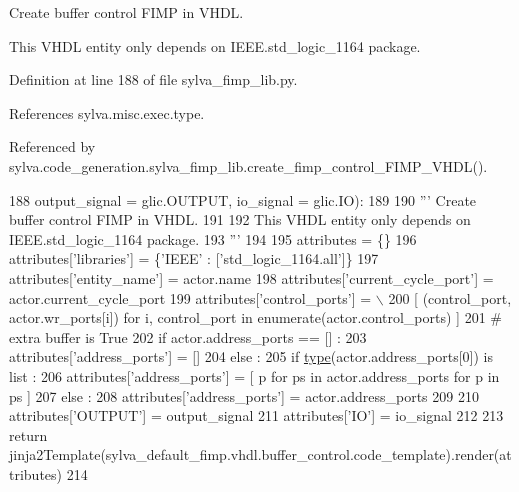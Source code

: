 \begin{DoxyVerb}Create buffer control FIMP in VHDL.

This VHDL entity only depends on IEEE.std_logic_1164 package.
\end{DoxyVerb}
 

Definition at line 188 of file sylva\+\_\+fimp\+\_\+lib.\+py.



References sylva.\+misc.\+exec.\+type.



Referenced by sylva.\+code\+\_\+generation.\+sylva\+\_\+fimp\+\_\+lib.\+create\+\_\+fimp\+\_\+control\+\_\+\+F\+I\+M\+P\+\_\+\+V\+H\+D\+L().


\begin{DoxyCode}
188     output\_signal = glic.OUTPUT, io\_signal = glic.IO):
189 
190     \textcolor{stringliteral}{''' Create buffer control FIMP in VHDL.}
191 \textcolor{stringliteral}{}
192 \textcolor{stringliteral}{    This VHDL entity only depends on IEEE.std\_logic\_1164 package.}
193 \textcolor{stringliteral}{    '''}
194 
195     attributes = \{\}
196     attributes[\textcolor{stringliteral}{'libraries'}] = \{\textcolor{stringliteral}{'IEEE'} : [\textcolor{stringliteral}{'std\_logic\_1164.all'}]\}
197     attributes[\textcolor{stringliteral}{'entity\_name'}] = actor.name
198     attributes[\textcolor{stringliteral}{'current\_cycle\_port'}] = actor.current\_cycle\_port
199     attributes[\textcolor{stringliteral}{'control\_ports'}] = \(\backslash\)
200       [ (control\_port, actor.wr\_ports[i]) \textcolor{keywordflow}{for} i, control\_port \textcolor{keywordflow}{in} enumerate(actor.control\_ports) ]
201     \textcolor{comment}{# extra buffer is True}
202     \textcolor{keywordflow}{if} actor.address\_ports == [] :
203       attributes[\textcolor{stringliteral}{'address\_ports'}] = []
204     \textcolor{keywordflow}{else} :
205       \textcolor{keywordflow}{if} \hyperlink{namespacesylva_1_1misc_1_1exec_a55d55e6d0e68715dfbd883034bd7290c}{type}(actor.address\_ports[0]) \textcolor{keywordflow}{is} list :
206         attributes[\textcolor{stringliteral}{'address\_ports'}] = [ p \textcolor{keywordflow}{for} ps \textcolor{keywordflow}{in} actor.address\_ports \textcolor{keywordflow}{for} p \textcolor{keywordflow}{in} ps ]
207       \textcolor{keywordflow}{else} :
208         attributes[\textcolor{stringliteral}{'address\_ports'}] = actor.address\_ports
209 
210     attributes[\textcolor{stringliteral}{'OUTPUT'}] = output\_signal
211     attributes[\textcolor{stringliteral}{'IO'}] = io\_signal
212 
213     \textcolor{keywordflow}{return} jinja2Template(sylva\_default\_fimp.vhdl.buffer\_control.code\_template).render(attributes)
214 
\end{DoxyCode}
